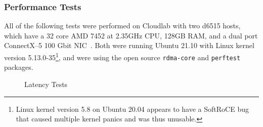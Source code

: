 \documentclass[12pt,titlepage]{article}
\begin{document}
\subsubsection*{Performance Tests}
All of the following tests were performed on Cloudlab with two d6515 hosts, which have a 32 core AMD 7452 at 2.35GHz CPU, 128GB RAM, and a dual port ConnectX--5 100 Gbit NIC~\cite{cloudlab}. 
Both were running Ubuntu 21.10 with Linux kernel version 5.13.0-35\footnote{Linux kernel version 5.8 on Ubuntu 20.04 appears to have a SoftRoCE bug that caused multiple kernel panics and was thus unusable.}, and were using the open source \texttt{rdma-core} and \texttt{perftest} packages.

\begin{figure}
	\centering
	\caption{Latency Tests}%
	\label{fig:softroce_latency}
\end{figure}
\end{document}
